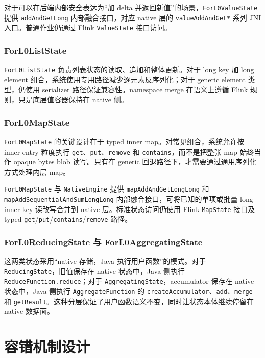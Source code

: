 \documentclass[a4paper,11pt]{article}
\begin{document}
对于可以在后端内部安全表达为“加 delta 并返回新值”的场景，\texttt{ForL0ValueState} 提供 \texttt{addAndGetLong} 内部融合接口，对应 native 层的 \texttt{valueAddAndGet*} 系列 JNI 入口。普通作业仍通过 Flink \texttt{ValueState} 接口访问。

\subsubsection{ForL0ListState}

\texttt{ForL0ListState} 负责列表状态的读取、追加和整体更新。对于 long key 加 long element 组合，系统使用专用路径减少逐元素反序列化；对于 generic element 类型，仍使用 serializer 路径保证兼容性。namespace merge 在语义上遵循 Flink 规则，只是底层值容器保持在 native 侧。

\subsubsection{ForL0MapState}

\texttt{ForL0MapState} 的关键设计在于 typed inner map。对常见组合，系统允许按 inner entry 粒度执行 \texttt{get}、\texttt{put}、\texttt{remove} 和 \texttt{contains}，而不是把整张 map 始终当作 opaque bytes blob 读写。只有在 generic 回退路径下，才需要通过通用序列化方式处理内层 map。

\texttt{ForL0MapState} 与 \texttt{NativeEngine} 提供 \texttt{mapAddAndGetLongLong} 和 \texttt{mapAddSequentialAndSumLongLong} 内部融合接口，可将已知的单项或批量 long inner-key 读改写合并到 native 层。标准状态访问仍使用 Flink \texttt{MapState} 接口及 typed \texttt{get}/\texttt{put}/\texttt{contains}/\texttt{remove} 路径。

\subsubsection{ForL0ReducingState 与 ForL0AggregatingState}

这两类状态采用“native 存储，Java 执行用户函数”的模式。对于 \texttt{ReducingState}，旧值保存在 native 状态中，Java 侧执行 \texttt{ReduceFunction.reduce}；对于 \texttt{AggregatingState}，accumulator 保存在 native 状态中，Java 侧执行 \texttt{AggregateFunction} 的 \texttt{createAccumulator}、\texttt{add}、\texttt{merge} 和 \texttt{getResult}。这种分层保证了用户函数语义不变，同时让状态本体继续停留在 native 数据面。

\section{容错机制设计}
\end{document}
